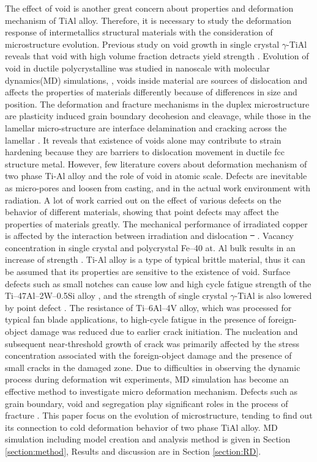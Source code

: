 \documentclass[materials,article,submit,moreauthors,pdftex,10pt,a4paper]{Definitions/mdpi}
\providecommand{\DIFadd}[1]{{\protect\color{blue}\uwave{#1}}} %
\providecommand{\DIFdel}[1]{{\protect\color{red}\sout{#1}}}                      %
\providecommand{\DIFaddbegin}{} %
\providecommand{\DIFaddend}{} %
\providecommand{\DIFdelbegin}{} %
\providecommand{\DIFdelend}{} %
\begin{document}
The effect of void is another great concern about properties and deformation mechanism  of TiAl alloy.  Therefore, it is necessary to study the deformation response of intermetallics structural materials with the consideration of microstructure evolution. Previous study on void growth in single crystal $\gamma$-TiAl reveals that void with high volume fraction detracts yield strength \cite{Tang2014, Xu2011}. Evolution of void in ductile polycrystalline was studied in nanoscale with molecular dynamics(MD) simulations, \cite{Jing2018a,Elkhateeb2018}, voids inside material are sources of dislocation and affects the properties of materials differently because of differences in size and position.  The deformation and fracture mechanisms in the duplex microstructure are plasticity induced grain boundary decohesion and cleavage, while those in the lamellar micro-structure are interface delamination and cracking across the lamellar \cite{Tang2014}. It reveals that existence of voids alone may contribute to strain hardening because they are barriers to dislocation movement in ductile fcc structure metal\cite{Xiong2015}. However, few literature covers about deformation mechanism of two phase Ti-Al alloy and the role of void in atomic scale. Defects are inevitable as micro-pores and loosen from casting, and in the actual work environment with radiation. A lot of work carried out on the  effect of various defects on the behavior of different materials, showing that point defects may affect the properties of materials greatly. The mechanical performance of irradiated copper is affected by the interaction between irradiation and dislocation \DIFdelbegin \DIFdel{\mbox{%
\cite{Kiener2011}}%
}\DIFdelend \DIFaddbegin \DIFadd{\mbox{%
\cite{Kiener2011b}}%
}\DIFaddend . Vacancy concentration in single crystal and polycrystal Fe–40 at. Al bulk results in an increase of strength \cite{Yang1998}. Ti-Al alloy is a type of typical brittle material, thus it can be assumed that its properties are sensitive to the existence of void. Surface defects such as small notches can cause low and high cycle fatigue strength of the Ti–47Al–2W–0.5Si alloy \cite{Nazmy2001}, and the strength of single crystal $\gamma$-TiAl is also lowered by point defect \cite{Wu2016}. The resistance of Ti–6Al–4V alloy, which was processed for typical fan blade applications, to high-cycle fatigue in the presence of foreign- object damage was reduced due to earlier crack initiation.  The nucleation and subsequent near-threshold growth of crack was primarily affected by the stress concentration associated with the foreign-object damage and the presence of small cracks in the damaged zone. Due to difficulties in observing the dynamic process during deformation wit experiments, MD simulation has become an effective method to investigate micro deformation mechanism. Defects such as grain boundary, void and segregation play significant roles in the process of fracture \cite{Larsen2016}. This paper focus on the evolution of microstructure, tending to find out its connection to cold deformation behavior of two phase TiAl alloy. MD simulation including model creation and analysis method is given in Section \ref{section:method}, Results and discussion are in Section \ref{section:RD}.
\end{document}
